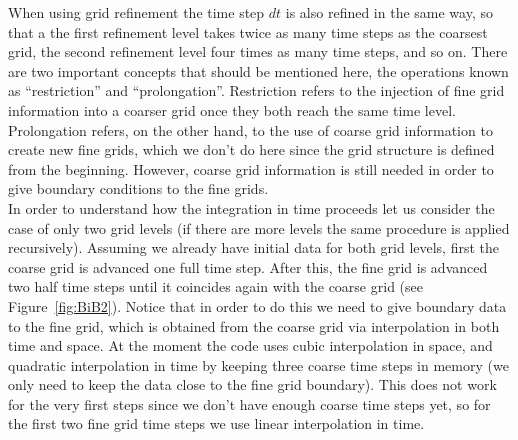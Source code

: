 \documentclass[12pt]{article}
\begin{document}
When using grid refinement the time step $dt$ is also refined in the
same way, so that a the first refinement level takes twice as many
time steps as the coarsest grid, the second refinement level four
times as many time steps, and so on. There are two important concepts
that should be mentioned here, the operations known as ``restriction''
and ``prolongation''.  Restriction refers to the injection of fine
grid information into a coarser grid once they both reach the same
time level.  Prolongation refers, on the other hand, to the use of
coarse grid information to create new fine grids, which we don't do
here since the grid structure is defined from the beginning.  However,
coarse grid information is still needed in order to give boundary
conditions to the fine grids. \\

In order to understand how the integration in time proceeds let us
consider the case of only two grid levels (if there are more levels
the same procedure is applied recursively). Assuming we already have
initial data for both grid levels, first the coarse grid is advanced
one full time step. After this, the fine grid is advanced two half
time steps until it coincides again with the coarse grid (see
Figure~\ref{fig:BiB2}).  Notice that in order to do this we need to
give boundary data to the fine grid, which is obtained from the coarse
grid via interpolation in both time and space.  At the moment the code
uses cubic interpolation in space, and quadratic interpolation in time
by keeping three coarse time steps in memory (we only need to keep the
data close to the fine grid boundary). This does not work for the very
first steps since we don't have enough coarse time steps yet, so for
the first two fine grid time steps we use linear interpolation in
time. \\
\end{document}
